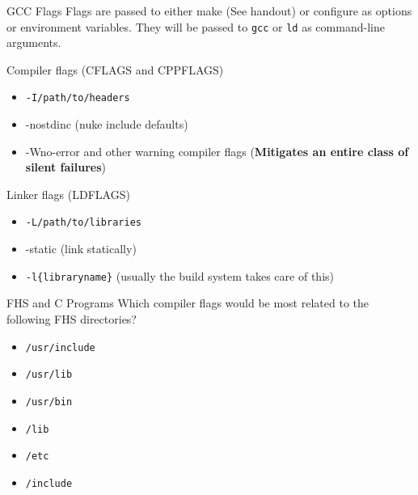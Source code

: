 \documentclass{../lecture}
\begin{document}
\begin{frame}{GCC Flags}
  Flags are passed to either make (See handout) or configure as options or
  environment variables. They will be passed to \texttt{gcc} or \texttt{ld} as
  command-line arguments.
  \begin{block}{Compiler flags (CFLAGS and CPPFLAGS)}
    \begin{itemize}
      \item \texttt{-I/path/to/headers}
      \item -nostdinc (nuke include defaults)
      \item -Wno-error and other warning compiler flags (\textbf{Mitigates an entire class of silent failures})
    \end{itemize}
  \end{block}
  \begin{block}{Linker flags (LDFLAGS)}
    \begin{itemize}
      \item \texttt{-L/path/to/libraries}
      \item -static (link statically)
      \item \texttt{-l\{libraryname\}} (usually the build system takes care of this)
    \end{itemize}
  \end{block}
\end{frame}

\begin{frame}{FHS and C Programs}
  Which compiler flags would be most related to the following FHS directories?
  \begin{itemize}
    \item \texttt{/usr/include} 
    \item \texttt{/usr/lib} 
    \item \texttt{/usr/bin} 
    \item \texttt{/lib} 
    \item \texttt{/etc} 
    \item \texttt{/include}
  \end{itemize}
\end{frame}
\end{document}
